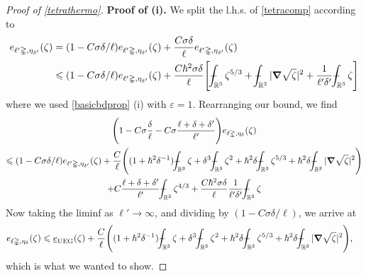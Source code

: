 \documentclass[10pt,a4paper]{amsart}
\newcommand{\RR}{\mathbb{R}}
\newcommand{\UEG}{\mathrm{UEG}} %
\def\XXint#1#2#3{{\setbox0=\hbox{$#1{#2#3}{\int}$ }
\vcenter{\hbox{$#2#3$ }}\kern-.6\wd0}}
\def\Xint#1{\mathchoice
{\XXint\displaystyle\textstyle{#1}}%
{\XXint\textstyle\scriptstyle{#1}}%
{\XXint\scriptstyle\scriptscriptstyle{#1}}%
{\XXint\scriptscriptstyle\scriptscriptstyle{#1}}%
\!\int}
\def\dashint{\Xint-}
\renewcommand{\epsilon}{\varepsilon}
\newcommand{\grad}{\bm{\nabla}} %
\renewcommand{\le}{\leqslant}
\newcommand{\tetra}{\mathbb{\Delta}} %
\newcommand{\ul}[1]{\underline{#1}}
\begin{document}
\begin{proof}[Proof of \cref{tetrathermo}]
\noindent\textbf{Proof of (i).}
We split the l.h.s. of \cref{tetracomp} according to 
\begin{align*}
e_{\ell'\tetra,\eta_{\delta'}}(\zeta)&=(1-C\sigma\delta/\ell) e_{\ell'\tetra,\eta_{\delta'}}(\zeta) +  \frac{C\sigma\delta}{\ell} e_{\ell'\tetra,\eta_{\delta'}}(\zeta)\\
&\le (1-C\sigma\delta/\ell) e_{\ell'\tetra,\eta_{\delta'}}(\zeta) + \frac{C\hbar^2\sigma\delta}{\ell} \Bigg[ \dashint_{\RR^3} \zeta^{5/3} + \dashint_{\RR^3} |\grad\sqrt{\zeta}|^2 +  \frac{1}{\ell'\delta'}\dashint_{\RR^3} \zeta \Bigg]
\end{align*}
where we used \cref{basicbdprop} (i) with $\epsilon=1$. Rearranging our bound, we find
\begin{multline*}
\Bigg( 1-C\sigma \frac{\delta}{\ell} -C\sigma\frac{\ell+\delta+\delta'}{\ell'}\Bigg) e_{\ell\tetra,\eta_{\delta}}(\zeta)\\
\le (1-C\sigma\delta/\ell) e_{\ell'\tetra,\eta_{\delta'}}(\zeta)
 +\frac{C}{\ell}\Bigg( (1+\hbar^2\delta^{-1}) \dashint_{\RR^3} \zeta + \delta^3\dashint_{\RR^3} \zeta^2 + \hbar^2\delta \dashint_{\RR^3} \zeta^{5/3} + \hbar^2\delta \dashint_{\RR^3} |\grad\sqrt{\zeta}|^2\Bigg) \\
 + C \frac{\ell+\delta+\delta'}{\ell'} \dashint_{\RR^3} \zeta^{4/3} + \frac{C\hbar^2\sigma\delta}{\ell}  \frac{1}{\ell'\delta'}\dashint_{\RR^3} \zeta
\end{multline*}
Now taking the liminf as $\ell'\to\infty$, and dividing by $(1-C\sigma\delta/\ell)$, we arrive at
\begin{align*}
&e_{\ell\tetra,\eta_{\delta}}(\zeta)\le \ul{e}_\UEG(\zeta) +\frac{C}{\ell}\Bigg( (1+\hbar^2\delta^{-1}) \dashint_{\RR^3} \zeta + \delta^3\dashint_{\RR^3} \zeta^2 + \hbar^2\delta \dashint_{\RR^3} \zeta^{5/3} + \hbar^2\delta \dashint_{\RR^3} |\grad\sqrt{\zeta}|^2\Bigg),
\end{align*}
which is what we wanted to show.


\end{proof}
\end{document}
